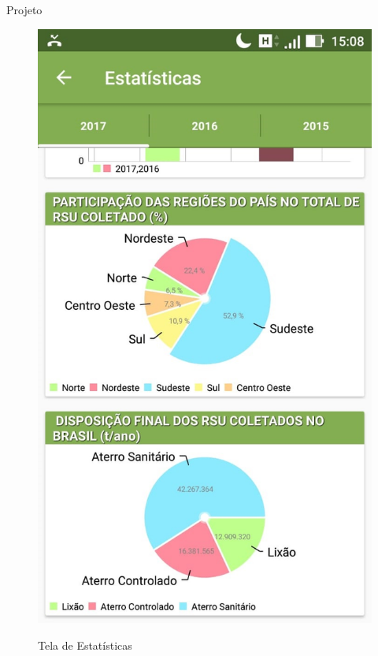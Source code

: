 \documentclass[
	12pt,				%
	openany,			%
	twoside,			%
	a4paper,			%
	english,			%
	french,				%
	spanish,			%
	brazil				%
	]{abntex2}
\begin{document}
\begin{chapter}{Projeto}
\begin{figure}[htb]
\begin{minipage}{0.45\textwidth}
     \label{fig:tela_stats_1}
  \end{minipage}
  \hfill
  \begin{minipage}{0.45\textwidth}
    \centering
    \caption{Tela de Estatísticas}
    \includegraphics[scale=0.35]{media/tela_stats_2.jpg}
     \label{fig:tela_stats_2}
  \end{minipage}
\end{figure}


\end{chapter}
\end{document}
